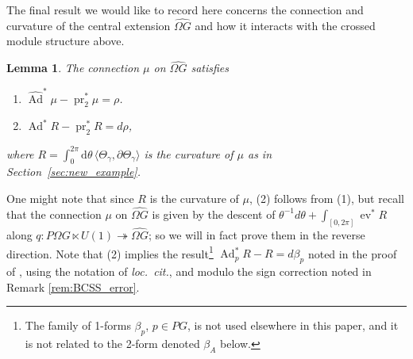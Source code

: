 \documentclass[12pt]{amsart}
\DeclareMathOperator{\Ad}{Ad}
\DeclareMathOperator{\pr}{pr}
\DeclareMathOperator{\ev}{ev}
\theoremstyle{plain}
\newtheorem{lemma}[theorem]{Lemma}
\theoremstyle{definition}
\theoremstyle{remark}
\numberwithin{equation}{section}
\newcommand{\<}{\langle}
\renewcommand{\>}{\rangle}
\newcommand{\intSone}{\int_{0}^{2\pi}\mathrm{d}\theta\,}
\newcommand{\Omegahat}[1]{\widehat{\Omega #1}}
\begin{document}
The final result we would like to record here concerns the connection and curvature of the central extension $\widehat{\Omega G}$ and how it interacts with the crossed module structure above. 

\begin{lemma}
The connection $\mu$ on $\Omegahat{G}$ satisfies
\begin{enumerate}
  \item $\widehat{\Ad}^*\mu - \pr_2^*\mu = \rho$.
  \item $\Ad^*R - \pr_2^*R = d\rho$,
\end{enumerate}
where $R= \intSone \langle\Theta_\gamma,\partial \Theta_\gamma \rangle$ is the curvature of $\mu$ as in Section~\ref{sec:new_example}.
\end{lemma}


One might note that since $R$ is the curvature of $\mu$, (2) follows from (1), but recall that the connection $\mu$ on $\Omegahat{G}$ is given by the descent of $\theta^{-1}d\theta + \int_{[0,2\pi]} \ev^* R$ along $q\colon P\Omega G \ltimes U(1) \twoheadrightarrow \Omegahat{G}$; so we will in fact prove them in the reverse direction. Note that (2) implies the result\footnote{The family of 1-forms $\beta_p$, $p\in PG$, is not used elsewhere in this paper, and it is not related to the 2-form denoted $\beta_A$ below.} $\Ad_p^*R - R = d\beta_p$ noted in the proof of \cite[Proposition 3.1]{BSCS}, using the notation of \emph{loc.\ cit.}, and modulo the sign correction noted in Remark \ref{rem:BCSS_error}.
\end{document}
